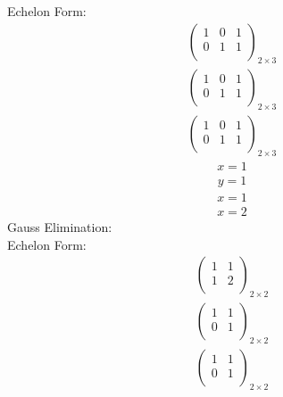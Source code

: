 \documentclass{article}
\begin{document}
Echelon Form:\\
\begin{align*}
\left(
\begin{array}{cc|c}
1 & 0 & 1\\
0 & 1 & 1\\
\end{array}
\right)_{2\times 3}
\end{align*}
\begin{align*}
\left(
\begin{array}{cc|c}
1 & 0 & 1\\
0 & 1 & 1\\
\end{array}
\right)_{2\times 3}
\end{align*}
\begin{align*}
\left(
\begin{array}{cc|c}
1 & 0 & 1\\
0 & 1 & 1\\
\end{array}
\right)_{2\times 3}
\end{align*}
\begin{align*}
x=1\end{align*}
\begin{align*}
y=1\end{align*}
\begin{align*}
x=1\end{align*}
\begin{align*}
x=2\end{align*}
Gauss Elimination:\\
Echelon Form:\\
\begin{align*}
\left(
\begin{array}{c|c}
1 & 1\\
1 & 2\\
\end{array}
\right)_{2\times 2}
\end{align*}
\begin{align*}
\left(
\begin{array}{c|c}
1 & 1\\
0 & 1\\
\end{array}
\right)_{2\times 2}
\end{align*}
\begin{align*}
\left(
\begin{array}{c|c}
1 & 1\\
0 & 1\\
\end{array}
\right)_{2\times 2}
\end{align*}
\end{document}
